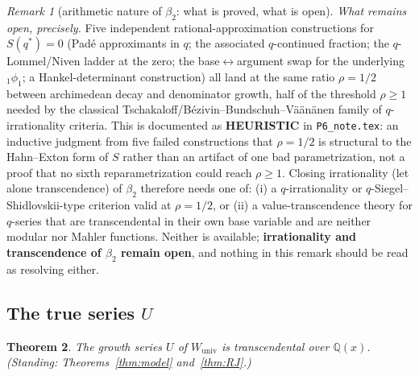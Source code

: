\documentclass[11pt]{article}
\theoremstyle{plain}
\newtheorem{theorem}{Theorem}
\theoremstyle{definition}
\theoremstyle{remark}
\newtheorem{remark}[theorem]{Remark}
\newcommand{\Q}{\mathbb{Q}}
\theoremstyle{plain}\newtheorem*{maintheorem}{Main Theorem}
\begin{document}
\begin{remark}[arithmetic nature of $\beta_2$: what is proved, what is open]
\emph{What remains open, precisely.} Five independent rational-approximation constructions for
$S(q^\ast)=0$ (Padé approximants in $q$; the associated $q$-continued fraction; the $q$-Lommel/Niven
ladder at the zero; the base$\leftrightarrow$argument swap for the underlying ${}_1\phi_1$; a
Hankel-determinant construction) all land at the same ratio $\rho=1/2$ between archimedean decay
and denominator growth, half of the threshold $\rho\ge1$ needed by the classical
Tschakaloff/Bézivin--Bundschuh--Väänänen family of $q$-irrationality criteria. This is documented
as \textbf{HEURISTIC} in \texttt{P6\_note.tex}: an inductive
judgment from five failed constructions that $\rho=1/2$ is structural to the Hahn--Exton form of
$S$ rather than an artifact of one bad parametrization, not a proof that no sixth
reparametrization could reach $\rho\ge1$. Closing irrationality (let alone transcendence) of
$\beta_2$ therefore needs one of: (i) a $q$-irrationality or $q$-Siegel--Shidlovskii-type
criterion valid at $\rho=1/2$, or (ii) a value-transcendence theory for $q$-series that are
transcendental in their own base variable and are neither modular nor Mahler functions. Neither
is available; \textbf{irrationality and transcendence of $\beta_2$ remain open}, and nothing in
this remark should be read as resolving either.
\end{remark}

\subsection{The true series \texorpdfstring{$U$}{U}}\label{sec:U}

\begin{theorem}\label{thm:U}
The growth series $U$ of $W_{\mathrm{univ}}$ is transcendental over $\Q(x)$.
\textup{(}Standing: Theorems~\ref{thm:model} and~\ref{thm:RJ}.\textup{)}
\end{theorem}
\end{document}
